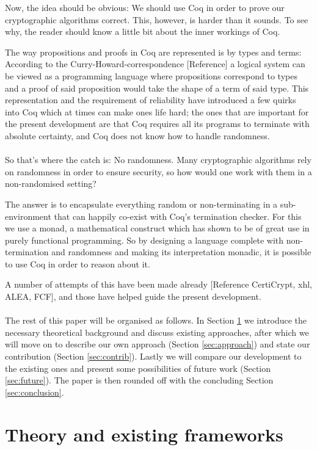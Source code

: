 \documentclass[titlepage]{article}
\begin{document}
Now, the idea should be obvious: We should use Coq in order to prove our
cryptographic algorithms correct. This, however, is harder than it sounds. To see
why, the reader should know a little bit about the inner workings of Coq. 

The way propositions and proofs in Coq are represented is by types and terms:
According to the Curry-Howard-correspondence [Reference] a logical system can be
viewed as a programming language where propositions correspond to types and a proof
of said proposition would take the shape of a term of said type. This representation
and the requirement of reliability have introduced a few quirks into Coq which at
times can make ones life hard; the ones that are important for the present
development are that Coq requires all its programs to terminate with absolute
certainty, and Coq does not know how to handle randomness. \\
\\
So that's where the catch is: No randomness. Many cryptographic algorithms rely on
randomness in order to ensure security, so how would one work with them in a
non-randomised setting?

The answer is to encapsulate everything random or non-terminating in a
sub-environment that can happily co-exist with Coq's termination checker. For this we
use a monad, a mathematical construct which has shown to be of great use in
purely functional programming. So by designing a language complete with
non-termination and randomness and making its interpretation monadic, it is possible
to use Coq in order to reason about it.

A number of attempts of this have been made already [Reference CertiCrypt, xhl, ALEA,
FCF], and those have helped guide the present development.\\
\\
The rest of this paper will be organised as follows. In Section \ref{sec:theory} we
introduce the necessary theoretical background and discuss existing approaches, after
which we will move on to describe our own approach (Section \ref{sec:approach}) and
state our contribution (Section \ref{sec:contrib}). Lastly we will compare our
development to the existing ones and present some possibilities of future work
(Section \ref{sec:future}). The paper is then rounded off with the concluding Section
  \ref{sec:conclusion}. 


\section{Theory and existing frameworks}\label{sec:theory}
\end{document}
